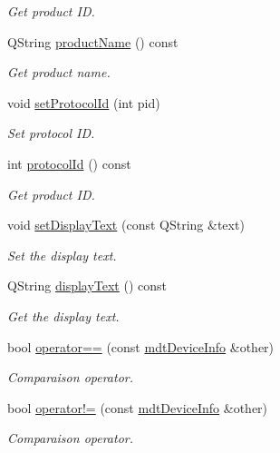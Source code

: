 \begin{DoxyCompactItemize}
\begin{DoxyCompactList}\small\item\em Get product ID. \end{DoxyCompactList}\item 
QString \hyperlink{classmdt_device_info_afe4bbdc87acff59999905a0eeb812fe1}{productName} () const 
\begin{DoxyCompactList}\small\item\em Get product name. \end{DoxyCompactList}\item 
\hypertarget{classmdt_device_info_ad90e39b5d34d4859527651cebb273e78}{
void \hyperlink{classmdt_device_info_ad90e39b5d34d4859527651cebb273e78}{setProtocolId} (int pid)}
\label{classmdt_device_info_ad90e39b5d34d4859527651cebb273e78}

\begin{DoxyCompactList}\small\item\em Set protocol ID. \end{DoxyCompactList}\item 
\hypertarget{classmdt_device_info_a9b3a09adc91393f3c3940f41ea0bf067}{
int \hyperlink{classmdt_device_info_a9b3a09adc91393f3c3940f41ea0bf067}{protocolId} () const }
\label{classmdt_device_info_a9b3a09adc91393f3c3940f41ea0bf067}

\begin{DoxyCompactList}\small\item\em Get product ID. \end{DoxyCompactList}\item 
void \hyperlink{classmdt_device_info_a26e8452ed2f254943225f4463ea31ef5}{setDisplayText} (const QString \&text)
\begin{DoxyCompactList}\small\item\em Set the display text. \end{DoxyCompactList}\item 
QString \hyperlink{classmdt_device_info_ad005eb082bd00b4da0883508b64935dd}{displayText} () const 
\begin{DoxyCompactList}\small\item\em Get the display text. \end{DoxyCompactList}\item 
bool \hyperlink{classmdt_device_info_ad029ec634403adbdd0382e9ceb1c1328}{operator==} (const \hyperlink{classmdt_device_info}{mdtDeviceInfo} \&other)
\begin{DoxyCompactList}\small\item\em Comparaison operator. \end{DoxyCompactList}\item 
bool \hyperlink{classmdt_device_info_a41ae61c66f404f80df4cad83fd6da138}{operator!=} (const \hyperlink{classmdt_device_info}{mdtDeviceInfo} \&other)
\begin{DoxyCompactList}\small\item\em Comparaison operator. \end{DoxyCompactList}\end{DoxyCompactItemize}


